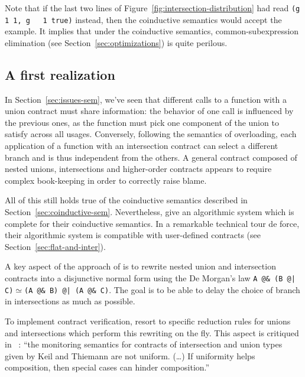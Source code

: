 \documentclass[sigplan,screen,10pt]{acmart}
\newcommand{\nickel}[1]{\lstinline[language=nickel]{#1}}
\begin{document}
Note that if the last two lines of
Figure~\ref{fig:intersection-distribution} had read \nickel{(g 1 1, g
  1 true)} instead, then the coinductive semantics would accept the
example. It implies that under the coinductive semantics,
common-subexpression elimination (see Section~\ref{sec:optimizations})
is quite perilous.

\subsection{A first realization}
\label{sec:keil-thiemann}

In Section~\ref{sec:issues-sem}, we've seen that different calls to a function
with a union contract must share information: the behavior of one call is
influenced by the previous ones, as the function must pick one component of the
union to satisfy across all usages. Conversely, following the semantics of
overloading, each application of a function with an intersection contract can
select a different branch and is thus independent from the others. A general
contract composed of nested unions, intersections and higher-order contracts
appears to require complex book-keeping in order to correctly raise
blame.

All of this still holds true of the coinductive semantics described in
Section~\ref{sec:coinductive-sem}.  Nevertheless,
\citeauthor{KeilThiemannUnionIntersection} give an algorithmic system which is
complete for their coinductive semantics. In a remarkable technical tour de
force, their algorithmic system is compatible with user-defined contracts (see
Section~\ref{sec:flat-and-inter}).

A key aspect of the approach of \citeauthor{KeilThiemannUnionIntersection}
is to rewrite nested union and intersection contracts into a
disjunctive normal form using the De Morgan's law \nickel{A @& (B @|
  C)}$\simeq$\nickel{(A @& B) @| (A @& C)}. The goal is to be able to
delay the choice of branch in intersections as much as possible.

To implement contract verification, \citeauthor{KeilThiemannUnionIntersection}
resort to specific reduction rules for unions and intersections which perform
this rewriting on the fly. This aspect is critiqued in
\citeauthor{RootCauseOfBlame}~\cite{RootCauseOfBlame}: ``the monitoring semantics for
contracts of intersection and union types given by Keil and Thiemann are not
uniform. (\ldots) If uniformity helps composition, then special cases can hinder
composition.''
\end{document}
